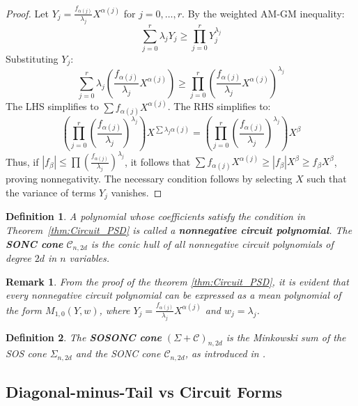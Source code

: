\documentclass{article}
\newtheorem{definition}{Definition}
\newtheorem{remark}{Remark}
\begin{document}
\begin{proof}
Let $Y_j = \frac{f_{\alpha(j)}}{\lambda_j} X^{\alpha(j)}$ for $j = 0, \dots, r$. By the weighted AM-GM inequality:
\[
   \sum_{j=0}^r \lambda_j Y_j \geq \prod_{j=0}^r Y_j^{\lambda_j}
\]
Substituting $Y_j$:
\[
   \sum_{j=0}^r \lambda_j \left( \frac{f_{\alpha(j)}}{\lambda_j} X^{\alpha(j)} \right) \geq \prod_{j=0}^r \left( \frac{f_{\alpha(j)}}{\lambda_j} X^{\alpha(j)} \right)^{\lambda_j}
\]
The LHS simplifies to $\sum f_{\alpha(j)} X^{\alpha(j)}$. The RHS simplifies to:
\[
   \left( \prod_{j=0}^r \left( \frac{f_{\alpha(j)}}{\lambda_j} \right)^{\lambda_j} \right) X^{\sum \lambda_j \alpha(j)} = \left( \prod_{j=0}^r \left( \frac{f_{\alpha(j)}}{\lambda_j} \right)^{\lambda_j} \right) X^{\beta}
\]
Thus, if $|f_\beta| \le \prod (\frac{f_{\alpha(j)}}{\lambda_j})^{\lambda_j}$, it follows that $\sum f_{\alpha(j)} X^{\alpha(j)} \ge |f_\beta| X^\beta \ge f_\beta X^\beta$, proving nonnegativity. The necessary condition follows by selecting $X$ such that the variance of terms $Y_j$ vanishes.
\end{proof}

\begin{definition}\label{def:SONC}
A polynomial whose coefficients satisfy the condition in Theorem~\ref{thm:Circuit_PSD} is called a 
\textbf{nonnegative circuit polynomial}.
The \textbf{SONC cone} $\mathcal{C}_{n,2d}$ is the conic hull of all nonnegative circuit polynomials of 
degree $2d$ in $n$ variables.
\end{definition}

\begin{remark}\label{rem:SONCinMEANS}
From the proof of the theorem \ref{thm:Circuit_PSD}, it is evident that every nonnegative circuit polynomial 
can be expressed as a mean polynomial of the form $M_{1,0}(Y,w)$, where 
$Y_j = \frac{f_{\alpha(j)}}{\lambda_j} X^{\alpha(j)}$ and $w_j = \lambda_j$.
\end{remark}

\begin{definition}\label{def:SOSONC}
The \textbf{SOSONC cone} $(\Sigma + \mathcal{C})_{n,2d}$ is the Minkowski sum of the SOS cone $\Sigma_{n,2d}$
and the SONC cone $\mathcal{C}_{n,2d}$, as introduced in \cite{DresslerSchick2025}.
\end{definition}

\subsection{Diagonal-minus-Tail vs Circuit Forms}
\end{document}
